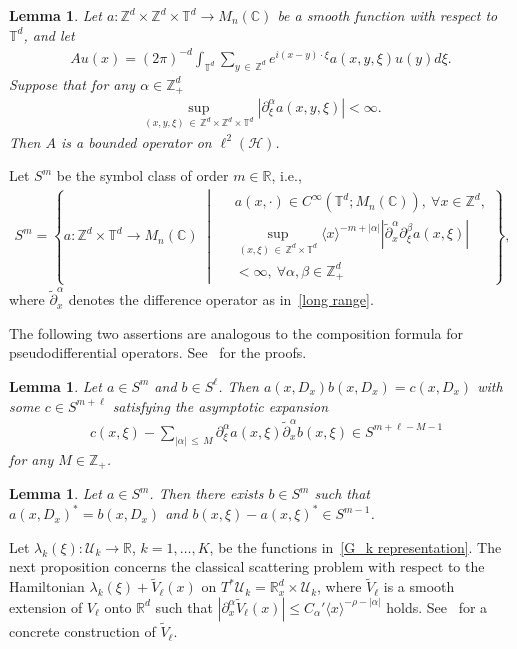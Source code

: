 \documentclass[10pt]{amsart}
\newtheorem{lemm}[theo]{Lemma}
\theoremstyle{definition}
\numberwithin{equation}{section}
\renewcommand{\a}{\alpha}
\renewcommand{\b}{\beta}
\renewcommand{\l}{\lambda}
\newcommand{\x}{\xi}
\newcommand{\C}{\mathbb{C}}
\newcommand{\R}{\mathbb{R}}
\newcommand{\Z}{\mathbb{Z}}
\newcommand{\T}{\mathbb{T}}
\newcommand{\HS}{\mathcal{H}}
\newcommand{\US}{\mathcal{U}}
\newcommand{\la}{\langle}
\newcommand{\ra}{\rangle}
\newcommand{\jap}[1]{\langle #1 \rangle}
\let\oldforall\forall
\renewcommand*{\forall}{\mathrel{\oldforall}}
\begin{document}
\begin{lemm}\label{PDO lemma}
Let $a:\Z^d\times\Z^d\times\T^d \to M_n(\C)$ be a smooth function with respect to $\T^d$, and let
\begin{align*}
Au(x) = (2\pi)^{-d} \int_{\T^d} \sum_{y\,\in\,\Z^d} e^{i(x-y)\cdot\x} a(x,y,\x) u(y)d\x.
\end{align*}
Suppose that for any $\a\in\Z_+^d$
\begin{align}\label{S^0}
\sup_{(x,y,\x)\,\in\,\Z^d\times\Z^d\times\T^d}\left|\partial_{\x}^\a a(x,y,\x)\right| < \infty.
\end{align}
Then $A$ is a bounded operator on $\ell^2(\HS)$.
\end{lemm}

Let $S^m$ be the symbol class of order $m\in\R$, i.e.,
\begin{align*}
S^m=\left\{ a: \Z^d\times\T^d \to M_n(\C) \;\middle|\;
\begin{aligned}
& a(x,\cdot)\in C^\infty\left(\T^d;M_n(\C)\right),\ \forall x\in\Z^d,\\ 
&\sup_{(x,\x)\,\in\,\Z^d\times\T^d} \jap{x}^{-m+|\a|} 
\left|\tilde\partial_{x}^\a\partial_{\x}^\b a(x,\x)\right|\\
&< \infty,\ \forall \a,\b\in\Z_+^d
\end{aligned}
\right\},
\end{align*}
where $\tilde\partial_{x}^\a$ denotes the difference operator as in~\eqref{long range}.

The following two assertions are analogous to the composition formula for pseudodifferential operators. See~\cite[Theorems~4.7.3 and 4.7.10]{R-T} for the proofs.

\begin{lemm}\label{composition lemma}
Let $a\in S^m$ and $b\in S^{\ell}$. Then $a(x,D_x)b(x,D_x)=c(x,D_x)$ with some $c\in S^{m+\ell}$ satisfying the asymptotic expansion
\begin{align*}
&c(x,\x) - \sum_{|\a|\,\leq\,M} \partial_{\x}^\a a(x,\x) \tilde\partial_{x}^\a b(x,\x) \in S^{m+\ell-M-1}
\end{align*}
for any $M\in\Z_+$.
\end{lemm}

\begin{lemm}\label{adjoint lemma}
Let $a\in S^m$. Then there exists $b\in S^m$ such that $a(x,D_x)^*=b(x,D_x)$ and $b(x,\x) - a(x,\x)^* \in S^{m-1}$.
\end{lemm}


\setcounter{section}{4}
\setcounter{theo}{0}
\setcounter{equation}{0}
Let $\l_k(\x):\US_k\to\R$, $k=1,\dots,K$, be the functions in~\eqref{G_k representation}. The next proposition concerns the classical scattering problem with respect to the Hamiltonian $\l_k(\x)+\tilde V_\ell(x)$ on $T^*\US_k=\R_x^d\times\US_k$, where $\tilde V_\ell$ is a smooth extension of $V_\ell$ onto $\R^d$ such that $|\partial_x^\a \tilde V_\ell(x)|\leq C_\a' \la x \ra^{-\rho-|\a|}$ holds. See~\cite[Lemma~2.1]{N} for a concrete construction of $\tilde V_\ell$.
\end{document}
